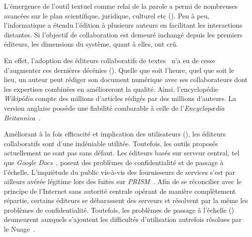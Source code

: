 L'émergence de l'outil textuel comme relai de la parole a permi de nombreuses
avancées sur le plan scientifique, juridique, culturel etc (\REF). Peu à peu,
l'informatique a étendu l'édition à plusieurs auteurs en facilitant les
interactions distantes. Si l'objectif de collaboration est demeuré inchangé
depuis les premiers éditeurs, les dimensions du système, quant à elles, ont crû.

En effet, l'adoption des éditeurs collaboratifs de
textes~\cite{ellis1991groupware} n'a eu de cesse d'augmenter ces dernières
décénies (\REF). Quelle que soit l'heure, quel que soit le lieu, un auteur peut
rédiger son document numérique avec ses collaborateurs dont les expertises
combinées en amélioreront la qualité. Ainsi, l'encyclopédie \emph{Wikipédia}
compte des millions d'articles rédigés par des millions d'auteurs. La version
anglaise possède une fiabilité combarable à celle de l'\emph{Encyclop\ae{}dia
  Britannica}~\cite{giles2005internet}.

Améliorant à la fois efficacité et implication des utilisateurs (\REF), les
éditeurs collaboratifs sont d'une indéniable utilitée. Toutefois, les outils
proposés actuellement ne sont pas sans défaut. Les éditeurs basés sur serveur
central, tel que \emph{Google Docs}~\cite{nichols1995high}, posent des problèmes
de confidentialité et de passage à l'échelle. L'inquiètude du public vis-à-vis
des fournisseurs de services s'est par ailleurs avérée légitime lors des fuites
sur \emph{PRISM}~\cite{gellman2013us}. Afin de se réconcilier avec le principe
de l'Internet sans autorité centrale opérant de manière complètement répartie,
certains éditeurs se débarassent des serveurs et résolvent par la même les
problèmes de confidentialité. Toutefois, les problèmes de passage à l'échelle
(\REF) deumeurent auxquels s'ajoutent les difficultés d'utilisation autrefois
résolues par le Nuage~\cite{mell2011national}.



